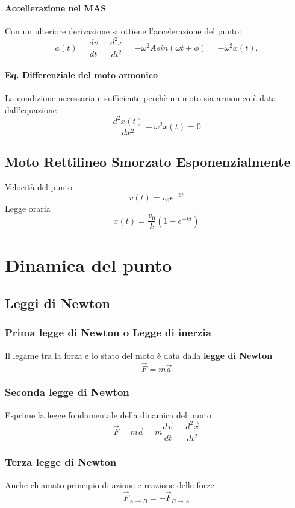 \documentclass[a4paper]{report}
\begin{document}
  \subsubsection{Accellerazione nel MAS}
  Con un ulteriore derivazione si ottiene l'accelerazione del punto:
  \[ a(t)=\frac{dv}{dt}=\frac{d^2 x}{dt^2} = -\omega^2 A sin(\omega t + \phi) = -\omega^2 x(t). \]
  \subsubsection{Eq. Differenziale del moto armonico}
  La condizione necessaria e sufficiente perchè un moto sia armonico è data dall'equazione
  \[ \frac{d^2 x(t)}{dx^2} + \omega^2 x(t) = 0 \]

  \section{Moto Rettilineo Smorzato Esponenzialmente}
  Velocità del punto
  \[ v(t) = v_0 e^{-kt} \]
  Legge oraria
  \[ x(t) = \frac{v_0}{k} (1-e^{-kt}) \]

  \chapter{Dinamica del punto}
  \section{Leggi di Newton}
  \subsection{Prima legge di Newton o Legge di inerzia}
  Il legame tra la forza e lo stato del moto è data dalla \textbf{legge di Newton}
  \[ \vec{F} = m\vec{a} \]

  \subsection{Seconda legge di Newton}
  Esprime la legge fondamentale della dinamica del punto
  \[ \vec{F} = m\vec{a} = m\frac{d\vec{v}}{dt} = \frac{d^2\vec{x}}{dt^2} \]

  \subsection{Terza legge di Newton}
  Anche chiamato principio di azione e reazione delle forze
  \[ \vec{F}_{A \rightarrow B} = -\vec{F}_{B \rightarrow A} \]
\end{document}
